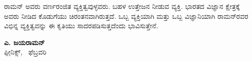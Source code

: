 ರಾಮನ್ ಅವರು ವರ್ಣರಂಜಿತ ವ್ಯಕ್ತಿತ್ವವುಳ್ಳವರು. ಬಹಳ ಉತ್ತೇಜನ ನೀಡುವ ವ್ಯಕ್ತಿ. ಭಾರತದ ವಿಜ್ಞಾನ ಕ್ಷೇತ್ರಕ್ಕೆ ಅವರು ನೀಡಿದ ಕೊಡುಗೆಯು ಚಿರಂತನವಾಗಿರುತ್ತದೆ. ಒಬ್ಬ ವ್ಯಕ್ತಿಯಾಗಿ ಮತ್ತು ಒಬ್ಬ ವಿಜ್ಞಾನಿಯಾಗಿ ರಾಮನ್‍ರವರ ವಿಭಿನ್ನ ವ್ಯಕ್ತಿತ್ವವನ್ನು ಈ ಕೃತಿಯು ಸಾದರಪಡಿಸುತ್ತದೆಂದು ಭಾವಿಸುತ್ತೇನೆ.

\begin{flushright}
\textbf{ಎ. ಜಯರಾಮನ್}\\ಫೀ಼ನಿಕ್ಸ್,~ ಫೆಬ್ರವರಿ 
\end{flushright}

